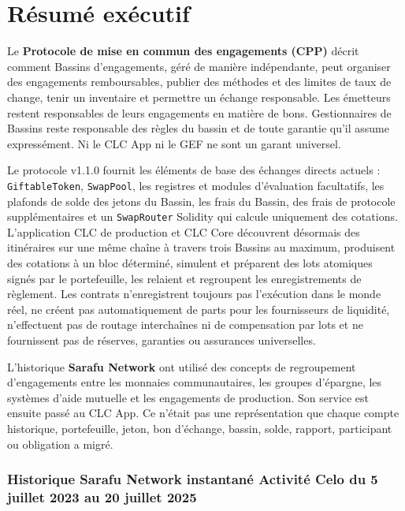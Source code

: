 \documentclass[11pt]{article}
\begin{document}
\section*{Résumé exécutif}

Le \textbf{Protocole de mise en commun des engagements (CPP)} décrit comment Bassins d'engagements, géré de manière indépendante, peut organiser des engagements remboursables, publier des méthodes et des limites de taux de change, tenir un inventaire et permettre un échange responsable. Les émetteurs restent responsables de leurs engagements en matière de bons. Gestionnaires de Bassins reste responsable des règles du bassin et de toute garantie qu'il assume expressément. Ni le CLC App ni le GEF ne sont un garant universel.

Le protocole v1.1.0 fournit les éléments de base des échanges directs actuels : \texttt{GiftableToken}, \texttt{SwapPool}, les registres et modules d'évaluation facultatifs, les plafonds de solde des jetons du Bassin, les frais du Bassin, des frais de protocole supplémentaires et un \texttt{SwapRouter} Solidity qui calcule uniquement des cotations. L'application CLC de production et CLC Core découvrent désormais des itinéraires sur une même chaîne à travers trois Bassins au maximum, produisent des cotations à un bloc déterminé, simulent et préparent des lots atomiques signés par le portefeuille, les relaient et regroupent les enregistrements de règlement. Les contrats n'enregistrent toujours pas l'exécution dans le monde réel, ne créent pas automatiquement de parts pour les fournisseurs de liquidité, n'effectuent pas de routage interchaînes ni de compensation par lots et ne fournissent pas de réserves, garanties ou assurances universelles.

L'historique \textbf{Sarafu Network} ont utilisé des concepts de regroupement d'engagements entre les monnaies communautaires, les groupes d'épargne, les systèmes d'aide mutuelle et les engagements de production. Son service est ensuite passé au CLC App. Ce n'était pas une représentation que chaque compte historique, portefeuille, jeton, bon d'échange, bassin, solde, rapport, participant ou obligation a migré.

\subsubsection*{Historique Sarafu Network instantané  Activité Celo du 5 juillet 2023 au 20 juillet 2025}
\end{document}
